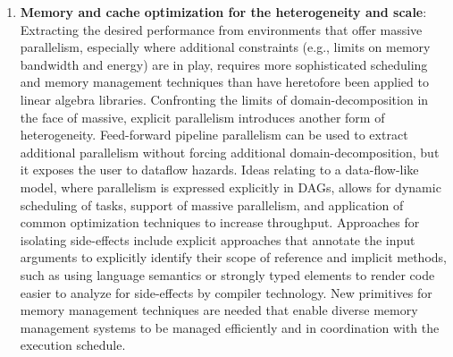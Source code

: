 \begin{enumerate}
	\item \textbf{Memory and cache optimization for the heterogeneity and scale}: Extracting the desired performance from environments that offer massive parallelism, especially where additional constraints (e.g., limits on memory bandwidth and energy) are in play, requires more sophisticated scheduling and memory management techniques than have heretofore been applied to linear algebra libraries. Confronting the limits of domain-decomposition in the face of massive, explicit parallelism introduces another form of heterogeneity. Feed-forward pipeline parallelism can be used to extract additional parallelism without forcing additional domain-decomposition, but it exposes the user to dataflow hazards. Ideas relating to a data-flow-like model, where parallelism is expressed explicitly in DAGs, allows for dynamic scheduling of tasks, support of massive parallelism, and application of common optimization techniques to increase throughput. Approaches for isolating side-effects include explicit approaches that annotate the input arguments to explicitly identify their scope of reference and implicit methods, such as using language semantics or strongly typed elements to render code easier to analyze for side-effects by compiler technology. New primitives for memory management techniques are needed that enable diverse memory management systems to be managed efficiently and in coordination with the execution schedule.
	

\end{enumerate}
